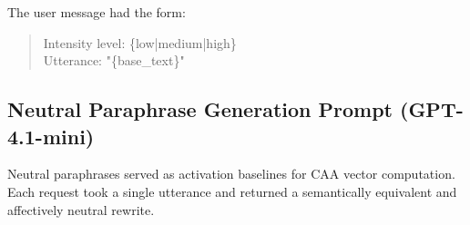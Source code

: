 \noindent The user message had the form:
\begin{quote}
\small\ttfamily
Intensity level: \{low|medium|high\}\\
Utterance: "\{base\_text\}"
\end{quote}

\subsection{Neutral Paraphrase Generation Prompt (GPT-4.1-mini)}
\label{app:neutral_prompt}

Neutral paraphrases served as activation baselines for CAA vector computation.
Each request took a single utterance and returned a semantically equivalent and affectively neutral rewrite.

